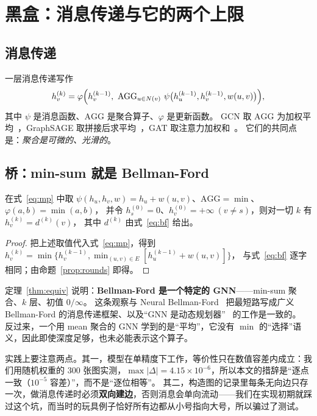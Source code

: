 \section{黑盒：消息传递与它的两个上限}\label{sec:black}

\subsection{消息传递}

一层消息传递写作
\begin{equation}
h_v^{(k)}=\varphi\Bigl(h_v^{(k-1)},\ \mathrm{AGG}_{u\in N(v)}\ \psi\bigl(h_u^{(k-1)},h_v^{(k-1)},w(u,v)\bigr)\Bigr),
\label{eq:mp}
\end{equation}
其中 $\psi$ 是消息函数、$\mathrm{AGG}$ 是聚合算子、$\varphi$ 是更新函数。
GCN 取 $\mathrm{AGG}$ 为加权平均~\cite{kipf2017gcn}，GraphSAGE 取拼接后求平均~\cite{hamilton2017graphsage}，GAT 取注意力加权和~\cite{velickovic2018gat}。
它们的共同点是：\emph{聚合是可微的、光滑的}。

\subsection{桥：min-sum 就是 Bellman-Ford}

\begin{theorem}[等价性]\label{thm:equiv}
在式~\eqref{eq:mp} 中取 $\psi(h_u,h_v,w)=h_u+w(u,v)$、$\mathrm{AGG}=\min$、$\varphi(a,b)=\min(a,b)$，
并令 $h^{(0)}_s=0$、$h^{(0)}_v=+\infty\ (v\ne s)$，则对一切 $k$ 有 $h^{(k)}_v=d^{(k)}(v)$，
其中 $d^{(k)}$ 由式~\eqref{eq:bf} 给出。
\end{theorem}
\begin{proof}
把上述取值代入式~\eqref{eq:mp}，得到
$h_v^{(k)}=\min\bigl\{h_v^{(k-1)},\min_{(u,v)\in E}[h_u^{(k-1)}+w(u,v)]\bigr\}$，
与式~\eqref{eq:bf} 逐字相同；由命题~\ref{prop:rounds} 即得。
\end{proof}

定理~\ref{thm:equiv} 说明：\textbf{Bellman-Ford 是一个特定的 GNN}——min-sum 聚合、$k$ 层、初值 $0/\infty$。
这条观察与 Neural Bellman-Ford~\cite{zhu2021neuralbf} 把最短路写成广义 Bellman-Ford 的消息传递框架、以及“GNN 是动态规划器”~\cite{dudzik2022dp} 的工作是一致的。
反过来，一个用 mean 聚合的 GNN 学到的是“平均”，它没有 $\min$ 的“选择”语义，因此即使深度足够，也未必能表示这个算子。

实践上要注意两点。其一，模型在单精度下工作，等价性只在数值容差内成立：我们用随机权重的 300 张图实测，$\max|\Delta|=4.15\times10^{-6}$，所以本文的措辞是“逐点一致（$10^{-5}$ 容差）”，而不是“逐位相等”。
其二，构造图的记录里每条无向边只存一次，做消息传递时必须\textbf{双向建边}，否则消息会单向流动——我们在实现初期就踩过这个坑，而当时的玩具例子恰好所有边都从小号指向大号，所以骗过了测试。

